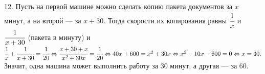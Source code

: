 12. Пусть на первой машине можно сделать копию пакета документов за $x$ минут, а на второй --- за $x+30.$ Тогда скорости их копирования равны $\cfrac{1}{x}$ и
$\cfrac{1}{x+30}$ (пакета в минуту) и $\cfrac{1}{x}+\cfrac{1}{x+30}=\cfrac{1}{20}\Leftrightarrow\cfrac{x+30+x}{x^2+30x}=\cfrac{1}{20}\Leftrightarrow
40x+600=x^2+30x\Leftrightarrow x^2-10x-600=0\Leftrightarrow x=30.$ Значит, одна машина может выполнить работу за 30 минут, а другая --- за 60.\\
